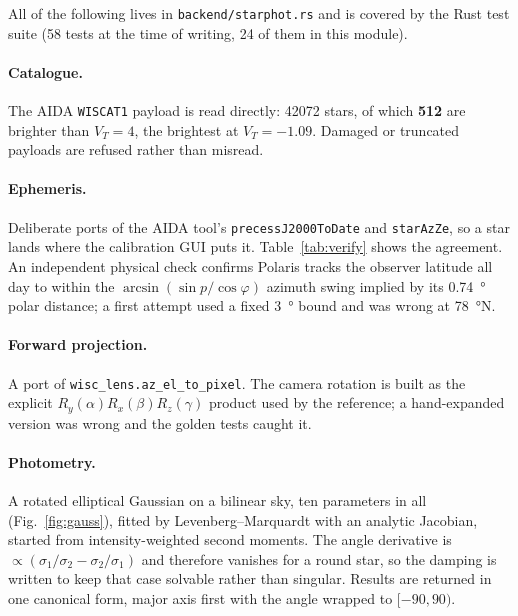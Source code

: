 \documentclass[11pt,a4paper]{article}
\begin{document}
All of the following lives in \texttt{backend/starphot.rs} and is covered by the
Rust test suite (58 tests at the time of writing, 24 of them in this module).

\paragraph{Catalogue.} The AIDA \texttt{WISCAT1} payload is read directly:
\num{42072} stars, of which \textbf{512} are brighter than $V_T=4$, the
brightest at $V_T=-1.09$. Damaged or truncated payloads are refused rather than
misread.

\paragraph{Ephemeris.} Deliberate ports of the AIDA tool's
\texttt{precessJ2000ToDate} and \texttt{starAzZe}, so a star lands where the
calibration GUI puts it. Table~\ref{tab:verify} shows the agreement. An
independent physical check confirms Polaris tracks the observer latitude all day
to within the $\arcsin(\sin p/\cos\varphi)$ azimuth swing implied by its
\SI{0.74}{\degree} polar distance; a first attempt used a fixed
\SI{3}{\degree} bound and was wrong at \SI{78}{\degree}N.

\paragraph{Forward projection.} A port of \texttt{wisc\_lens.az\_el\_to\_pixel}.
The camera rotation is built as the explicit $R_y(\alpha)R_x(\beta)R_z(\gamma)$
product used by the reference; a hand-expanded version was wrong and the golden
tests caught it.

\paragraph{Photometry.} A rotated elliptical Gaussian on a bilinear sky, ten
parameters in all (Fig.~\ref{fig:gauss}), fitted by Levenberg--Marquardt with an
analytic Jacobian, started from intensity-weighted second moments. The angle
derivative is $\propto(\sigma_1/\sigma_2-\sigma_2/\sigma_1)$ and therefore
vanishes for a round star, so the damping is written to keep that case solvable
rather than singular. Results are returned in one canonical form, major axis
first with the angle wrapped to $[-90,90)$.
\end{document}
